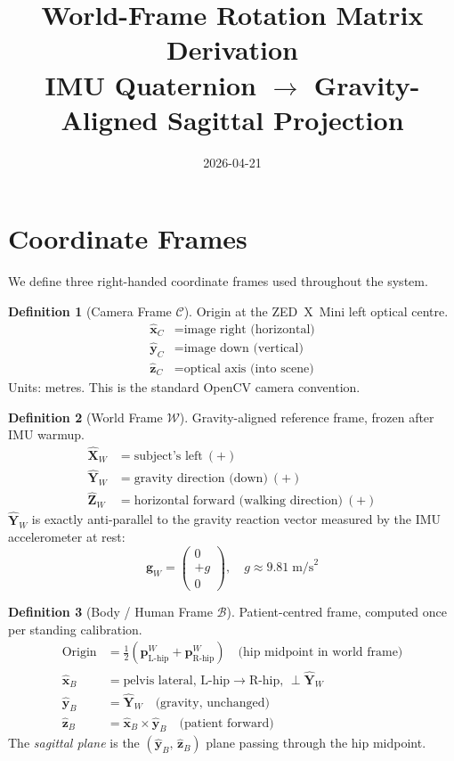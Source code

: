 \documentclass[11pt, a4paper]{article}
\title{\textbf{World-Frame Rotation Matrix Derivation}\\
       \large IMU Quaternion $\to$ Gravity-Aligned Sagittal Projection}
\date{2026-04-21}
\newcommand{\vv}[1]{\bm{#1}}          %
\newcommand{\frame}[1]{\mathcal{#1}}  %
\theoremstyle{definition}
\newtheorem{defn}{Definition}
\begin{document}
\maketitle
\tableofcontents
\vspace{1em}

\section{Coordinate Frames}

We define three right-handed coordinate frames used throughout the system.

\begin{defn}[Camera Frame $\frame{C}$]
Origin at the ZED~X~Mini left optical centre.
\begin{align*}
  \hat{\vv{x}}_C &= \text{image right (horizontal)} \\
  \hat{\vv{y}}_C &= \text{image down  (vertical)} \\
  \hat{\vv{z}}_C &= \text{optical axis (into scene)}
\end{align*}
Units: metres. This is the standard OpenCV camera convention.
\end{defn}

\begin{defn}[World Frame $\frame{W}$]
Gravity-aligned reference frame, frozen after IMU warmup.
\begin{align*}
  \hat{\vv{X}}_W &= \text{subject's left}\ (+) \\
  \hat{\vv{Y}}_W &= \text{gravity direction (down)}\ (+) \\
  \hat{\vv{Z}}_W &= \text{horizontal forward (walking direction)}\ (+)
\end{align*}
$\hat{\vv{Y}}_W$ is exactly anti-parallel to the gravity reaction vector measured
by the IMU accelerometer at rest:
\[
  \vv{g}_W = \begin{pmatrix} 0 \\ +g \\ 0 \end{pmatrix}, \quad g \approx 9.81\;\text{m/s}^2
\]
\end{defn}

\begin{defn}[Body / Human Frame $\frame{B}$]
Patient-centred frame, computed once per standing calibration.
\begin{align*}
  \text{Origin}  &= \tfrac{1}{2}(\vv{p}^W_{\text{L-hip}} + \vv{p}^W_{\text{R-hip}})
                    \quad\text{(hip midpoint in world frame)} \\
  \hat{\vv{x}}_B &= \text{pelvis lateral, L-hip} \to \text{R-hip, } \perp \hat{\vv{Y}}_W \\
  \hat{\vv{y}}_B &= \hat{\vv{Y}}_W \quad\text{(gravity, unchanged)} \\
  \hat{\vv{z}}_B &= \hat{\vv{x}}_B \times \hat{\vv{y}}_B \quad\text{(patient forward)}
\end{align*}
The \emph{sagittal plane} is the $(\hat{\vv{y}}_B,\,\hat{\vv{z}}_B)$ plane passing through
the hip midpoint.
\end{defn}
\end{document}

